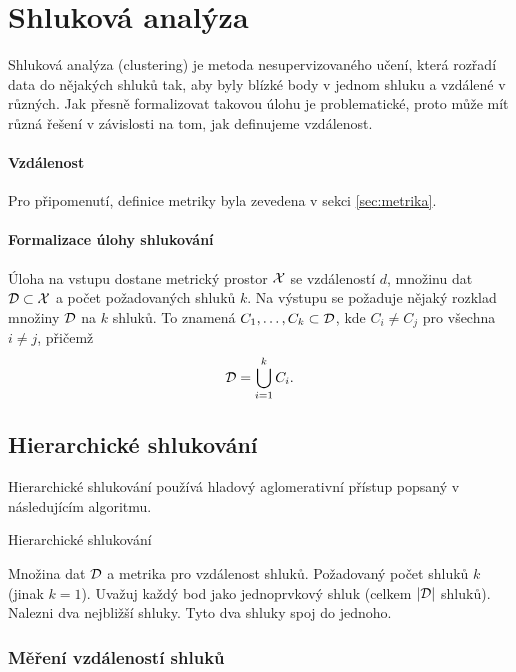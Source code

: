 \documentclass[../main.tex]{subfiles}
\begin{document}
\section{Shluková analýza}

Shluková analýza (clustering) je metoda nesupervizovaného učení, která rozřadí data do nějakých shluků tak, aby byly blízké body v jednom shluku a vzdálené v různých. Jak přesně formalizovat takovou úlohu je problematické, proto může mít různá řešení v závislosti na tom, jak definujeme vzdálenost.

\paragraph{Vzdálenost} Pro připomenutí, definice metriky byla zevedena v sekci \ref{sec:metrika}.

\paragraph{Formalizace úlohy shlukování} Úloha na vstupu dostane metrický prostor $\mathcal{X}$ se vzdáleností $d$, množinu dat $\mathcal{D} \subset \mathcal{X}$ a počet požadovaných shluků $k$. Na výstupu se požaduje nějaký rozklad množiny $\mathcal{D}$ na $k$ shluků. To znamená $C_1, \ldots, C_k \subset \mathcal{D}$, kde $C_i \neq C_j$ pro všechna $i \neq j$, přičemž \[\mathcal{D} = \bigcup_{i=1}^{k} C_i.\]

\subsection{Hierarchické shlukování}

Hierarchické shlukování používá hladový aglomerativní přístup popsaný v následujícím algoritmu.

\begin{algorithm}[H]
    \renewcommand{\thealgorithm}{}
    \caption{Hierarchické shlukování}
    \begin{algorithmic}[1]
        \Require
        \Statex Množina dat $\mathcal{D}$ a metrika pro vzdálenost shluků.
        \Statex Požadovaný počet shluků $k$ (jinak $k=1$).
        \Statex
        \State Uvažuj každý bod jako jednoprvkový shluk (celkem $|\mathcal{D}|$ shluků).
        \State Nalezni dva nejbližší shluky.
        \State Tyto dva shluky spoj do jednoho.
        \EndWhile
    \end{algorithmic}
\end{algorithm}

\subsubsection{Měření vzdáleností shluků}
\end{document}
